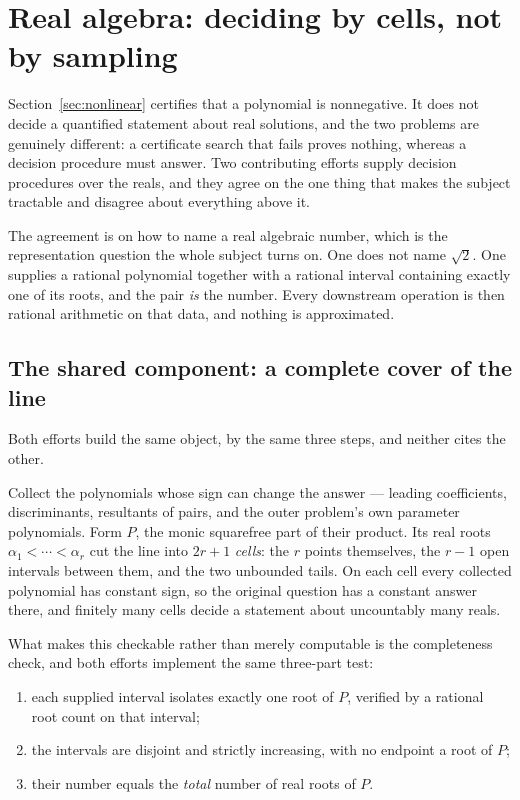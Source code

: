 \section{Real algebra: deciding by cells, not by sampling}
\label{sec:realalgebraic}

Section~\ref{sec:nonlinear} certifies that a polynomial is nonnegative. It does
not decide a quantified statement about real solutions, and the two problems
are genuinely different: a certificate search that fails proves nothing,
whereas a decision procedure must answer. Two contributing efforts supply
decision procedures over the reals, and they agree on the one thing that makes
the subject tractable and disagree about everything above it.

The agreement is on how to name a real algebraic number, which is the
representation question the whole subject turns on. One does not name
$\sqrt2$. One supplies a rational polynomial together with a rational interval
containing exactly one of its roots, and the pair \emph{is} the number. Every
downstream operation is then rational arithmetic on that data, and nothing is
approximated.

\subsection{The shared component: a complete cover of the line}

Both efforts build the same object, by the same three steps, and neither cites
the other.

Collect the polynomials whose sign can change the answer --- leading
coefficients, discriminants, resultants of pairs, and the outer problem's own
parameter polynomials. Form $P$, the monic squarefree part of their product.
Its real roots $\alpha_1<\cdots<\alpha_r$ cut the line into $2r+1$ \emph{cells}:
the $r$ points themselves, the $r-1$ open intervals between them, and the two
unbounded tails. On each cell every collected polynomial has constant sign, so
the original question has a constant answer there, and finitely many cells
decide a statement about uncountably many reals.

What makes this checkable rather than merely computable is the completeness
check, and both efforts implement the same three-part test:

\begin{enumerate}[leftmargin=1.4em]
\item each supplied interval isolates exactly one root of $P$, verified by a
  rational root count on that interval;
\item the intervals are disjoint and strictly increasing, with no endpoint a
  root of $P$;
\item their number equals the \emph{total} number of real roots of $P$.
\end{enumerate}

